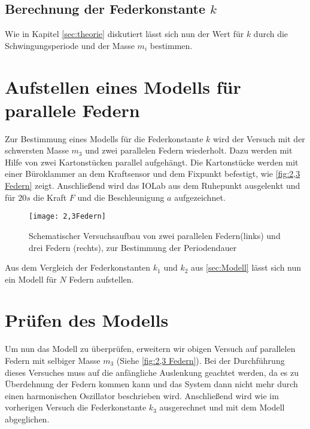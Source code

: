 \subsection{Berechnung der Federkonstante $k$}
Wie in Kapitel \autoref{sec:theorie} diskutiert lässt sich nun der Wert für $k$ durch die Schwingungsperiode und der Masse $m_i$ bestimmen.
\section{Aufstellen eines Modells für parallele Federn}
\label{sec:Modell}
Zur Bestimmung eines Modells für die Federkonstante $k$ wird der Versuch mit der schwersten  Masse $m_3$ und zwei parallelen Federn wiederholt. Dazu werden mit Hilfe von zwei Kartonstücken parallel aufgehängt. Die Kartonstücke werden mit einer Büroklammer an dem Kraftsensor und dem Fixpunkt befestigt, wie \autoref{fig:2,3 Federn} zeigt. Anschließend wird das IOLab aus dem Ruhepunkt ausgelenkt und für $20s$ die Kraft $F$ und die Beschleunigung $a$ aufgezeichnet.
\begin{figure}[H]
	\centering
	\texttt{[image: 2,3Federn]}
	\caption[Versuchsaufbau mit mehrere Federn]{Schematischer Versuchsaufbau von zwei parallelen Federn(links) und drei Federn (rechts), zur Bestimmung der Periodendauer}
	\label{fig:2,3 Federn}
\end{figure}
Aus dem Vergleich der Federkonstanten $k_1$ und $k_2$ aus \autoref{sec:Modell} lässt sich nun ein Modell für $N$ Federn aufstellen.
\section{Prüfen des Modells}
Um nun das Modell zu überprüfen, erweitern wir obigen Versuch auf parallelen Federn mit selbiger Masse $m_3$ (Siehe \autoref{fig:2,3 Federn}). Bei der Durchführung dieses Versuches muss auf die anfängliche Auslenkung geachtet werden, da es zu Überdehnung der Federn kommen kann und das System dann nicht mehr durch einen harmonischen Oszillator beschrieben wird. Anschließend wird wie im vorherigen Versuch die Federkonstante \( k_3 \) ausgerechnet und mit dem Modell abgeglichen.